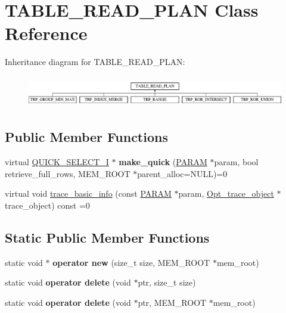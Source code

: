 \hypertarget{classTABLE__READ__PLAN}{}\section{T\+A\+B\+L\+E\+\_\+\+R\+E\+A\+D\+\_\+\+P\+L\+AN Class Reference}
\label{classTABLE__READ__PLAN}
Inheritance diagram for T\+A\+B\+L\+E\+\_\+\+R\+E\+A\+D\+\_\+\+P\+L\+AN\+:\begin{figure}[H]
\begin{center}
\leavevmode
\includegraphics[height=1.408805cm]{classTABLE__READ__PLAN}
\end{center}
\end{figure}
\subsection*{Public Member Functions}
\begin{DoxyCompactItemize}
\item 
\mbox{\label{classTABLE__READ__PLAN_add97a6146773697f75860cdf7bd1f1be}} 
virtual \mbox{\hyperlink{classQUICK__SELECT__I}{Q\+U\+I\+C\+K\+\_\+\+S\+E\+L\+E\+C\+T\+\_\+I}} $\ast$ {\bfseries make\+\_\+quick} (\mbox{\hyperlink{classPARAM}{P\+A\+R\+AM}} $\ast$param, bool retrieve\+\_\+full\+\_\+rows, M\+E\+M\+\_\+\+R\+O\+OT $\ast$parent\+\_\+alloc=N\+U\+LL)=0
\item 
virtual void \mbox{\hyperlink{classTABLE__READ__PLAN_a35e1758c9edce0c8bea19a602409f861}{trace\+\_\+basic\+\_\+info}} (const \mbox{\hyperlink{classPARAM}{P\+A\+R\+AM}} $\ast$param, \mbox{\hyperlink{classOpt__trace__object}{Opt\+\_\+trace\+\_\+object}} $\ast$trace\+\_\+object) const =0
\end{DoxyCompactItemize}
\subsection*{Static Public Member Functions}
\begin{DoxyCompactItemize}
\item 
\mbox{\label{classTABLE__READ__PLAN_a1022f17eff0bb64aa89c338b7a50cc67}} 
static void $\ast$ {\bfseries operator new} (size\+\_\+t size, M\+E\+M\+\_\+\+R\+O\+OT $\ast$mem\+\_\+root)
\item 
\mbox{\label{classTABLE__READ__PLAN_a3b17a84479b732ed4c904eab62a445aa}} 
static void {\bfseries operator delete} (void $\ast$ptr, size\+\_\+t size)
\item 
\mbox{\label{classTABLE__READ__PLAN_a5f1fe215f9a62849cb96e5840f56af29}} 
static void {\bfseries operator delete} (void $\ast$ptr, M\+E\+M\+\_\+\+R\+O\+OT $\ast$mem\+\_\+root)
\end{DoxyCompactItemize}
